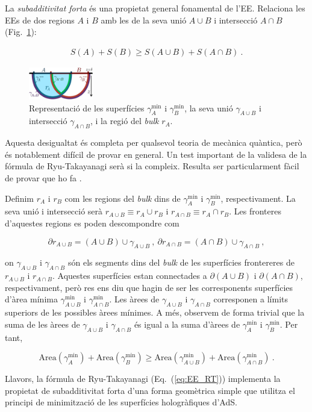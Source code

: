 \documentclass[twocolumn]{revtex4}
\providecommand{\eq}[2]{
    \begin{equation}
        #2
    \label{eq:#1}
    \end{equation}
}
\providecommand{\eqgat}[2]{
    \begin{gather}
        #2
    \label{eq:#1}
    \end{gather}
}
\begin{document}
La \emph{subadditivitat forta} és una propietat general fonamental de l'EE. Relaciona les EEs de dos regions $A$ i $B$ amb les de la seva unió $A \cup B$ i intersecció $A \cap B$ (Fig.~\ref{fig:SS}):
\eqgat{EE_strong-subadd}{
S(A) + S(B) \ge S(A \cup B) + S(A \cap B) \ .
}
\begin{figure}
\centering
\includegraphics[width=0.25\textwidth]{../../Imatges/SS_2-D.png}
\caption{Representació de les superfícies $\gamma_A^\text{min}$ i $\gamma_B^\text{min}$, la seva unió $\gamma_{A \cup B}$ i intersecció $\gamma_{A \cap B}$, i la regió del \emph{bulk} $r_A$.}
\label{fig:SS}
\end{figure}
Aquesta desigualtat és completa per qualsevol teoria de mecànica quàntica, però és notablement difícil de provar en general. Un test important de la validesa de la fórmula de Ryu-Takayanagi serà si la compleix. Resulta ser particularment fàcil de provar que ho fa \cite{headrick_holographic_2007}.

Definim $r_A$ i $r_B$ com les regions del \emph{bulk} dins de $\gamma^{\text{min}}_A$ i $\gamma^{\text{min}}_B$, respectivament. La seva unió i intersecció serà $r_{A \cup B} \equiv r_A \cup r_B$ i $r_{A \cap B} \equiv r_A \cap r_B$. Les fronteres d'aquestes regions es poden descompondre com
\eq{SS_dr-1}{
\partial r_{A \cup B} = (A \cup B) \cup \gamma_{A \cup B} \ , \ \partial r_{A \cap B } = (A \cap B) \cup \gamma_{A \cap B} \ , \nonumber
}
on $\gamma_{A \cup B}$ i $\gamma_{A \cap B}$ són els segments dins del \emph{bulk} de les superfícies frontereres de $r_{A \cup B}$ i $r_{A \cap B}$. Aquestes superfícies estan connectades a $\partial (A \cup B)$ i $\partial (A \cap B)$, respectivament, però res ens diu que hagin de ser les corresponents superfícies d'àrea mínima $\gamma^{\text{min}}_{A \cup B}$ i $\gamma^{\text{min}}_{A \cap B}$. Les àrees de $\gamma_{A \cup B}$ i $\gamma_{A \cap B}$ corresponen a límits superiors de les possibles àrees mínimes. A més, observem de forma trivial que la suma de les àrees de $\gamma_{A \cup B}$ i $\gamma_{A \cap B}$ és igual a la suma d'àrees de $\gamma^{\text{min}}_A$ i $\gamma^{\text{min}}_B$. Per tant,
\eq{SS_gamma-1}{
{\text{Area}}(\gamma^{\text{min}}_A) + {\text{Area}}(\gamma^{\text{min}}_B) \ge {\text{Area}}(\gamma^{\text{min}}_{A \cup B}) + {\text{Area}}(\gamma^{\text{min}}_{A \cap B}) \ . \nonumber
}
Llavors, la fórmula de Ryu-Takayanagi (Eq.~(\ref{eq:EE_RT})) implementa la propietat de subadditivitat forta d'una forma geomètrica simple que utilitza el principi de minimització de les superfícies hologràfiques d'AdS.
\end{document}
